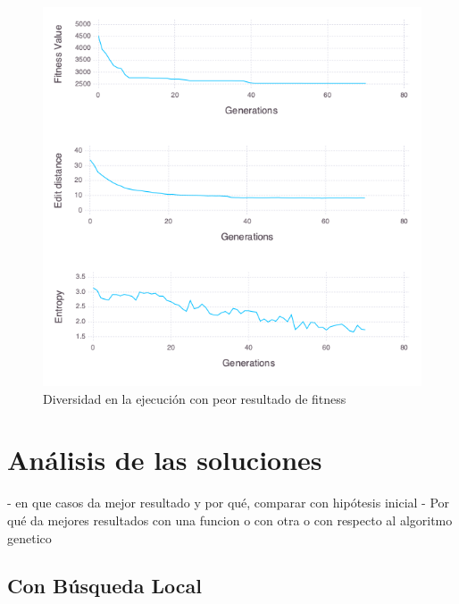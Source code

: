 \begin{figure}[]
	\centering	
	\includegraphics[scale=0.5]{figuras/config_file_1_Rastrigin_worst_f_value.png}
	\caption{ Diversidad en la ejecución con peor resultado de fitness }
    \label{fig:worst_f_value}
\end{figure}

\section{Análisis de las soluciones}

- en que casos da mejor resultado y por qué, comparar con hipótesis inicial
- Por qué da mejores resultados con una funcion o con otra o con respecto al algoritmo genetico


\subsection{Con Búsqueda Local}

